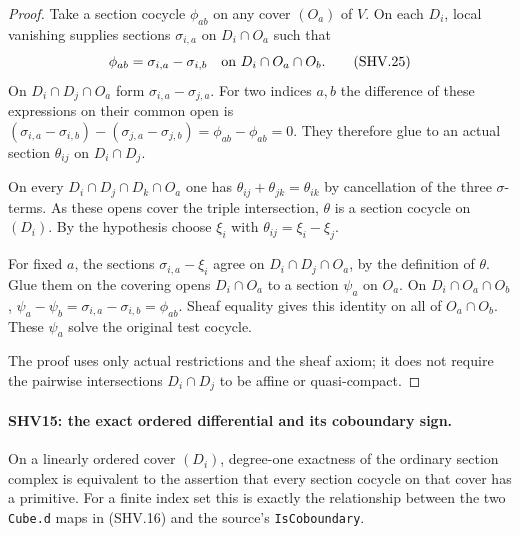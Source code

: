 \begin{proof}
Take a section cocycle $\phi_{ab}$ on any cover $(O_a)$ of $V$.
On each $D_i$, local vanishing supplies sections
$\sigma_{i,a}$ on $D_i\cap O_a$ such that
\[
                 \phi_{ab}=\sigma_{i,a}-\sigma_{i,b}
                 \quad\hbox{on }D_i\cap O_a\cap O_b.
                                                        \tag{SHV.25}
\]
On $D_i\cap D_j\cap O_a$ form
$\sigma_{i,a}-\sigma_{j,a}$.
For two indices $a,b$ the difference of these expressions on
their common open is
$(\sigma_{i,a}-\sigma_{i,b})
 -(\sigma_{j,a}-\sigma_{j,b})=\phi_{ab}-\phi_{ab}=0$.
They therefore glue to an actual section
$\theta_{ij}$ on $D_i\cap D_j$.

On every $D_i\cap D_j\cap D_k\cap O_a$ one has
$\theta_{ij}+\theta_{jk}=\theta_{ik}$ by cancellation of
the three $\sigma$-terms.  As these opens cover the triple
intersection, $\theta$ is a section cocycle on $(D_i)$.
By the hypothesis choose $\xi_i$ with
$\theta_{ij}=\xi_i-\xi_j$.

For fixed $a$, the sections
$\sigma_{i,a}-\xi_i$ agree on
$D_i\cap D_j\cap O_a$, by the definition of $\theta$.
Glue them on the covering opens $D_i\cap O_a$ to a section
$\psi_a$ on $O_a$.  On $D_i\cap O_a\cap O_b$,
$\psi_a-\psi_b=\sigma_{i,a}-\sigma_{i,b}=\phi_{ab}$.
Sheaf equality gives this identity on all of $O_a\cap O_b$.
These $\psi_a$ solve the original test cocycle.

The proof uses only actual restrictions and the sheaf axiom;
it does not require the pairwise intersections $D_i\cap D_j$
to be affine or quasi-compact.
\end{proof}

\paragraph{SHV15: the exact ordered differential and its coboundary sign.}
\label{claim:SHV15}
On a linearly ordered cover $(D_i)$, degree-one exactness of
the ordinary section complex is equivalent to the assertion
that every section cocycle on that cover has a primitive.
For a finite index set this is exactly the relationship between
the two \texttt{Cube.d} maps in (SHV.16) and the source's
\texttt{IsCoboundary}.

